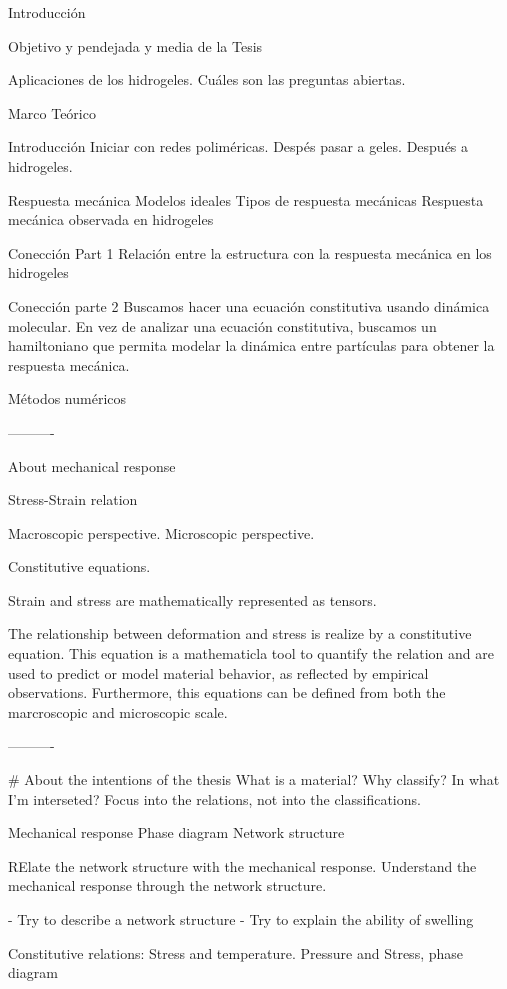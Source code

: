Introducción

Objetivo y pendejada y media de la Tesis

Aplicaciones de los hidrogeles.
Cuáles son las preguntas abiertas.



Marco Teórico

Introducción
Iniciar con redes poliméricas.
Despés pasar a geles.
Después a hidrogeles.

Respuesta mecánica
Modelos ideales
Tipos de respuesta mecánicas
Respuesta mecánica observada en hidrogeles

Conección Part 1
Relación entre la estructura con la respuesta mecánica en los hidrogeles

Conección parte 2
Buscamos hacer una ecuación constitutiva usando dinámica molecular.
En vez de analizar una ecuación constitutiva, buscamos un hamiltoniano que permita modelar la dinámica entre partículas para obtener la respuesta mecánica.


Métodos numéricos

----------

About mechanical response

Stress-Strain relation

Macroscopic perspective.
Microscopic perspective.

Constitutive equations.

Strain and stress are mathematically represented as tensors.

The relationship between deformation and stress is realize by a constitutive equation.
This equation is a mathematicla tool to quantify the relation and are used to predict or model material behavior, as reflected by empirical observations.
Furthermore, this equations can be defined from both the marcroscopic and microscopic scale.


----------

# About the intentions of the thesis
What is a material?
Why classify?
In what I'm interseted?
Focus into the relations, not into the classifications.

Mechanical response
Phase diagram
Network structure

RElate the network structure with the mechanical response.
Understand the mechanical response through the network structure.

- Try to describe a network structure
- Try to explain the ability of swelling

Constitutive relations: Stress and temperature.
Pressure and Stress, phase diagram


































